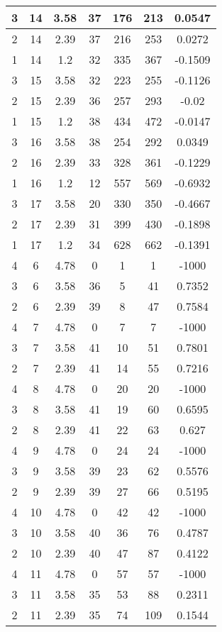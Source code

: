 \documentclass[letterpaper, 12pt]{article}
\begin{document}
\begin{longtable}{|c|c|c|c|c|c|c|}
\hline
3 & 14 & 3.58 & 37 & 176 & 213 & 0.0547 \\
\hline
2 & 14 & 2.39 & 37 & 216 & 253 & 0.0272 \\
\hline
1 & 14 & 1.2 & 32 & 335 & 367 & -0.1509 \\
\hline
3 & 15 & 3.58 & 32 & 223 & 255 & -0.1126 \\
\hline
2 & 15 & 2.39 & 36 & 257 & 293 & -0.02 \\
\hline
1 & 15 & 1.2 & 38 & 434 & 472 & -0.0147 \\
\hline
3 & 16 & 3.58 & 38 & 254 & 292 & 0.0349 \\
\hline
2 & 16 & 2.39 & 33 & 328 & 361 & -0.1229 \\
\hline
1 & 16 & 1.2 & 12 & 557 & 569 & -0.6932 \\
\hline
3 & 17 & 3.58 & 20 & 330 & 350 & -0.4667 \\
\hline
2 & 17 & 2.39 & 31 & 399 & 430 & -0.1898 \\
\hline
1 & 17 & 1.2 & 34 & 628 & 662 & -0.1391 \\
\hline
4 & 6 & 4.78 & 0 & 1 & 1 & -1000 \\
\hline
3 & 6 & 3.58 & 36 & 5 & 41 & 0.7352 \\
\hline
2 & 6 & 2.39 & 39 & 8 & 47 & 0.7584 \\
\hline
4 & 7 & 4.78 & 0 & 7 & 7 & -1000 \\
\hline
3 & 7 & 3.58 & 41 & 10 & 51 & 0.7801 \\
\hline
2 & 7 & 2.39 & 41 & 14 & 55 & 0.7216 \\
\hline
4 & 8 & 4.78 & 0 & 20 & 20 & -1000 \\
\hline
3 & 8 & 3.58 & 41 & 19 & 60 & 0.6595 \\
\hline
2 & 8 & 2.39 & 41 & 22 & 63 & 0.627 \\
\hline
4 & 9 & 4.78 & 0 & 24 & 24 & -1000 \\
\hline
3 & 9 & 3.58 & 39 & 23 & 62 & 0.5576 \\
\hline
2 & 9 & 2.39 & 39 & 27 & 66 & 0.5195 \\
\hline
4 & 10 & 4.78 & 0 & 42 & 42 & -1000 \\
\hline
3 & 10 & 3.58 & 40 & 36 & 76 & 0.4787 \\
\hline
2 & 10 & 2.39 & 40 & 47 & 87 & 0.4122 \\
\hline
4 & 11 & 4.78 & 0 & 57 & 57 & -1000 \\
\hline
3 & 11 & 3.58 & 35 & 53 & 88 & 0.2311 \\
\hline
2 & 11 & 2.39 & 35 & 74 & 109 & 0.1544 \\

\end{longtable}
\end{document}
